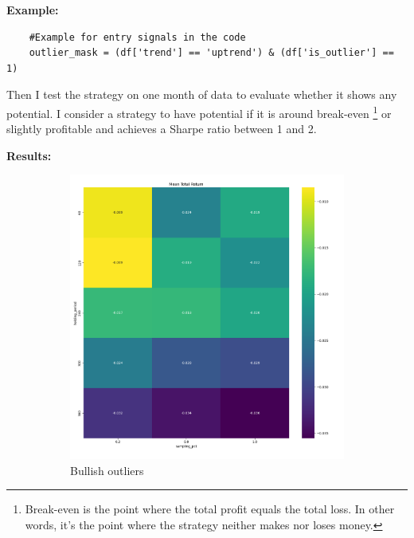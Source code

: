 \documentclass[12pt]{article}
\begin{document}
\newpage
\textbf{Example:}

\begin{verbatim}
    #Example for entry signals in the code
    outlier_mask = (df['trend'] == 'uptrend') & (df['is_outlier'] == 1)
\end{verbatim}

Then I test the strategy on one month of data to evaluate whether it shows any potential. I consider a strategy to have potential if it is around break-even \footnote{Break-even is the point where the total profit equals the total loss. In other words, it's the point where the strategy neither makes nor loses money.} or slightly profitable and achieves a Sharpe ratio between 1 and 2.

\textbf{Results:}

\begin{figure}[H]
    \centering
    \begin{subfigure}[b]{0.48\textwidth}
        \includegraphics[width=\textwidth,height=0.3\textheight,keepaspectratio]{imgs/example_backtest_for_thesis.png}
        \caption{Bullish outliers}
        \label{fig:bullish_outliers}
    \end{subfigure}
    \hfill
    \begin{subfigure}[b]{0.48\textwidth}

\end{subfigure}
\end{figure}
\end{document}
